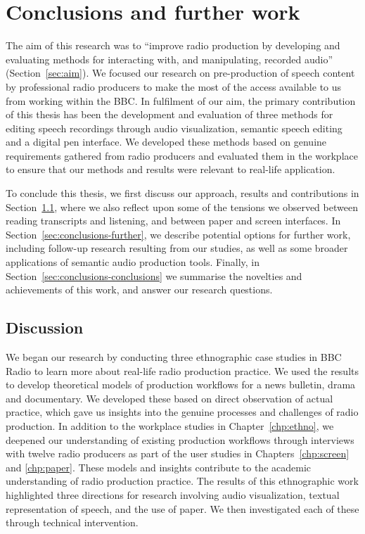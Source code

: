 \chapter{Conclusions and further work}\label{chp:conclusions}

The aim of this research was to ``improve radio production by developing and evaluating methods for interacting with,
and manipulating, recorded audio'' (Section~\ref{sec:aim}).  We focused our research on pre-production of speech
content by professional radio producers to make the most of the access available to us from working within the BBC.  In
fulfilment of our aim, the primary contribution of this thesis has been the development and evaluation of three methods
for editing speech recordings through audio visualization, semantic speech editing and a digital pen interface.  We
developed these methods based on genuine requirements gathered from radio producers and evaluated them in the workplace
to ensure that our methods and results were relevant to real-life application.

To conclude this thesis, we first discuss our approach, results and contributions in
Section~\ref{sec:conclusions-discussion}, where we also reflect upon some of the tensions we observed between reading
transcripts and listening, and between paper and screen interfaces.  In Section~\ref{sec:conclusions-further}, we
describe potential options for further work, including follow-up research resulting from our studies, as well as some
broader applications of semantic audio production tools.  Finally, in Section~\ref{sec:conclusions-conclusions} we
summarise the novelties and achievements of this work, and answer our research questions.

\section{Discussion}\label{sec:conclusions-discussion}

We began our research by conducting three ethnographic case studies in BBC Radio to learn more about real-life
radio production practice.  We used the results to develop theoretical models of production workflows for a news
bulletin, drama and documentary.  We developed these based on direct observation of actual practice, which gave us 
insights into the genuine processes and challenges of radio production.  In addition to the workplace studies in
Chapter~\ref{chp:ethno}, we deepened our understanding of existing production workflows through interviews with twelve
radio producers as part of the user studies in Chapters~\ref{chp:screen} and \ref{chp:paper}.  These models and
insights contribute to the academic understanding of radio production practice.  The results of this ethnographic work
highlighted three directions for research involving audio visualization, textual representation of speech, and the use
of paper.  We then investigated each of these through technical intervention.

